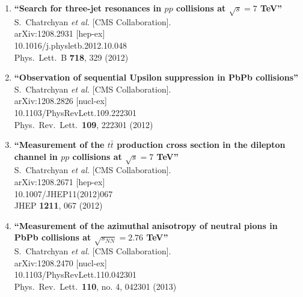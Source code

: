 \documentclass{article}
\begin{document}
\begin{enumerate}
\item%
{\bf ``Search for three-jet resonances in $pp$ collisions at $\sqrt{s}=7$ TeV''}
  \\{}S.~Chatrchyan {\it et al.}  [CMS Collaboration].
  \\{}arXiv:1208.2931 [hep-ex]
    \\{}10.1016/j.physletb.2012.10.048
\\{}Phys.\ Lett.\ B {\bf 718}, 329 (2012) %


\item%
{\bf ``Observation of sequential Upsilon suppression in PbPb collisions''}
  \\{}S.~Chatrchyan {\it et al.}  [CMS Collaboration].
  \\{}arXiv:1208.2826 [nucl-ex]
    \\{}10.1103/PhysRevLett.109.222301
\\{}Phys.\ Rev.\ Lett.\  {\bf 109}, 222301 (2012) %


\item%
{\bf ``Measurement of the $t\bar{t}$ production cross section in the dilepton channel in $pp$ collisions at $\sqrt{s}=7$ TeV''}
  \\{}S.~Chatrchyan {\it et al.}  [CMS Collaboration].
  \\{}arXiv:1208.2671 [hep-ex]
    \\{}10.1007/JHEP11(2012)067
\\{}JHEP {\bf 1211}, 067 (2012) %


\item%
{\bf ``Measurement of the azimuthal anisotropy of neutral pions in PbPb collisions at $\sqrt{s_{NN}}=2.76$ TeV''}
  \\{}S.~Chatrchyan {\it et al.}  [CMS Collaboration].
  \\{}arXiv:1208.2470 [nucl-ex]
    \\{}10.1103/PhysRevLett.110.042301
\\{}Phys.\ Rev.\ Lett.\  {\bf 110}, no. 4, 042301 (2013) %



\end{enumerate}
\end{document}
